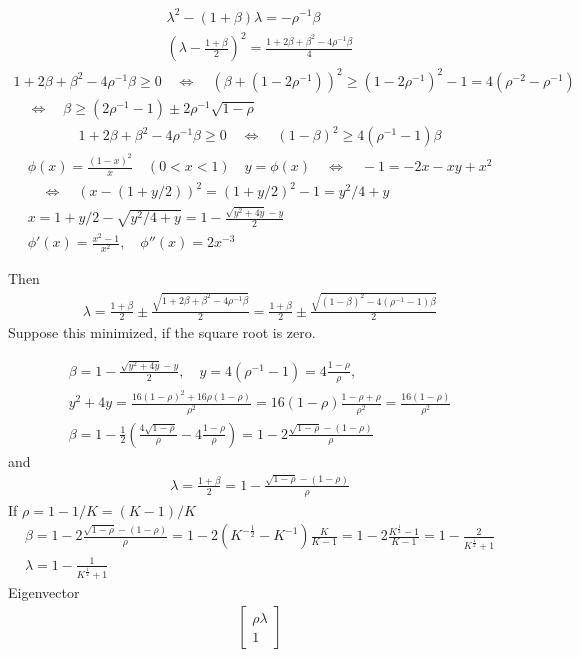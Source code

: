 \documentclass[english,12pt,a4paper]{article}
\begin{document}
%
%
\begin{align*}
\lambda^2 -(1+\beta)\lambda = - \rho^{-1}\beta\\
\left(\lambda - \frac{1+\beta}{2}\right)^2 = \frac{1 + 2\beta + \beta^2 - 4\rho^{-1}\beta}{4}
\end{align*}
%
%
\begin{align*}
1 + 2\beta + \beta^2 - 4\rho^{-1}\beta \ge 0 \quad\Leftrightarrow\quad 
\left(\beta + (1-2\rho^{-1})\right)^2\ge (1-2\rho^{-1})^2-1 = 4(\rho^{-2}-\rho^{-1})\\
\quad\Leftrightarrow\quad \beta \ge (2\rho^{-1}-1) \pm 2 \rho^{-1}\sqrt{1-\rho}
\end{align*}
%
%
\begin{align*}
1 + 2\beta + \beta^2 - 4\rho^{-1}\beta \ge 0 \quad\Leftrightarrow\quad 
\left(1-\beta\right)^2 \ge 4(\rho^{-1}-1)\beta
\end{align*}
%
%
\begin{align*}
\phi(x) = \frac{(1-x)^2}{x}\quad (0<x<1)\quad y = \phi(x) \quad\Leftrightarrow\quad -1 = -2x -xy +x^2\\
 \quad\Leftrightarrow\quad (x- (1+y/2))^2= (1+y/2)^2-1 = y^2/4 + y\\
 x = 1+y/2 - \sqrt{y^2/4 + y} = 1 - \frac{\sqrt{y^2+4y}-y}{2}\\
 \phi'(x) = \frac{x^2-1}{x^2},\quad \phi''(x) = 2x^{-3}
\end{align*}
%

Then
%
\begin{align*}
\lambda =  \frac{1+\beta}{2} \pm \frac{\sqrt{1 + 2\beta + \beta^2 - 4\rho^{-1}\beta}}{2}
= \frac{1+\beta}{2} \pm \frac{\sqrt{(1 -\beta)^2 - 4(\rho^{-1}-1)\beta}}{2}
\end{align*}
%
Suppose this minimized, if the square root is zero.

%
\begin{align*}
\beta = 1 - \frac{\sqrt{y^2+4y}-y}{2},\quad y = 4(\rho^{-1}-1) = 4\frac{1-\rho}{\rho},\quad \\
y^2+4y = \frac{16(1-\rho)^2+16\rho(1-\rho)}{\rho^2}=16(1-\rho)\frac{1-\rho+\rho}{\rho^2}=\frac{16(1-\rho)}{\rho^2}\\
\beta = 1 - \frac12\left( \frac{4\sqrt{1-\rho}}{\rho}-4\frac{1-\rho}{\rho}\right)
 = 1 - 2\frac{\sqrt{1-\rho}-(1-\rho)}{\rho}
\end{align*}
%
and
%
\begin{align*}
\lambda =  \frac{1+\beta}{2}  = 1 -\frac{\sqrt{1-\rho}-(1-\rho)}{\rho}
\end{align*}
%
If $\rho = 1 - 1/K= (K-1)/K$
%
\begin{align*}
\beta = 1 - 2\frac{\sqrt{1-\rho}-(1-\rho)}{\rho} = 1 - 2(K^{-\frac12}-K^{-1})\frac{K}{K-1}
= 1 - 2\frac{K^{\frac12}-1}{K-1} = 1 -\frac{2}{K^{\frac12}+1}\\
\lambda = 1 - \frac{1}{K^{\frac12}+1}
\end{align*}
%
Eigenvector
%
\begin{align*}
\begin{bmatrix}
\rho\lambda \\ 1
\end{bmatrix}
\end{align*}
%
\end{document}
